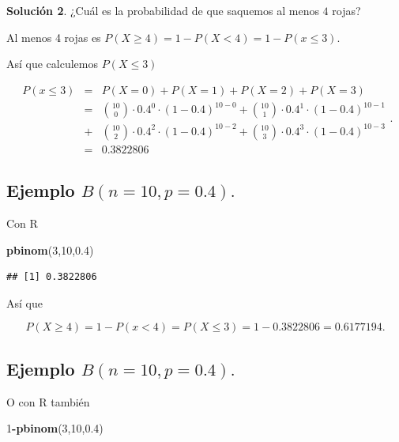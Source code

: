 \documentclass[]{book}
\newenvironment{Shaded}{\begin{snugshade}}{\end{snugshade}}
\newcommand{\DecValTok}[1]{\textcolor[rgb]{0.00,0.00,0.81}{#1}}
\newcommand{\FloatTok}[1]{\textcolor[rgb]{0.00,0.00,0.81}{#1}}
\newcommand{\KeywordTok}[1]{\textcolor[rgb]{0.13,0.29,0.53}{\textbf{#1}}}
\newcommand{\NormalTok}[1]{#1}
\newcommand{\OperatorTok}[1]{\textcolor[rgb]{0.81,0.36,0.00}{\textbf{#1}}}
\begin{document}
\textbf{Solución 2}. ¿Cuál es la probabilidad de que saquemos al menos \(4\) rojas?

Al menos 4 rojas es \(P(X \geq 4)=1-P(X<4)=1-P(x\leq 3).\)

Así que calculemos \(P(X\leq 3)\)

\[
\begin{eqnarray*}
P(x\leq 3)&=& P(X=0)+P(X=1)+P(X=2)+P(X=3)\\
&=& 
 {10\choose 0}\cdot 0.4^0\cdot (1-0.4)^{10-0}+ {10\choose 1}\cdot 0.4^1\cdot (1-0.4)^{10-1}\\
&+&{10\choose 2}\cdot 0.4^2\cdot (1-0.4)^{10-2}+ {10\choose 3}\cdot 0.4^3\cdot (1-0.4)^{10-3}\\
&=&0.3822806
\end{eqnarray*}
.
\]

\hypertarget{ejemplo-bn10p0.4.-3}{%
\subsection{\texorpdfstring{Ejemplo \(B(n=10,p=0.4).\)}{Ejemplo B(n=10,p=0.4).}}\label{ejemplo-bn10p0.4.-3}}

Con R

\begin{Shaded}
\begin{Highlighting}[]
\KeywordTok{pbinom}\NormalTok{(}\DecValTok{3}\NormalTok{,}\DecValTok{10}\NormalTok{,}\FloatTok{0.4}\NormalTok{)}
\end{Highlighting}
\end{Shaded}

\begin{verbatim}
## [1] 0.3822806
\end{verbatim}

Así que

\[P(X \geq 4 )=1-P(x< 4)=P(X\leq 3)=1-0.3822806=0.6177194.\]

\hypertarget{ejemplo-bn10p0.4.-4}{%
\subsection{\texorpdfstring{Ejemplo \(B(n=10,p=0.4).\)}{Ejemplo B(n=10,p=0.4).}}\label{ejemplo-bn10p0.4.-4}}

O con R también

\begin{Shaded}
\begin{Highlighting}[]
\DecValTok{1}\OperatorTok{-}\KeywordTok{pbinom}\NormalTok{(}\DecValTok{3}\NormalTok{,}\DecValTok{10}\NormalTok{,}\FloatTok{0.4}\NormalTok{)}
\end{Highlighting}
\end{Shaded}
\end{document}
